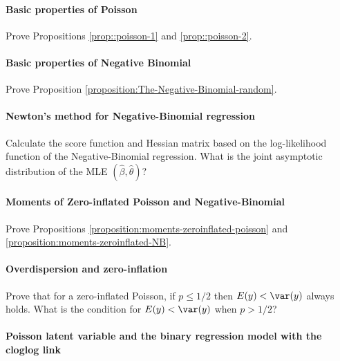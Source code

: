  
 
 \paragraph{Basic properties of Poisson}\label{hw19::poisson12}
 
Prove Propositions \ref{prop::poisson-1} and \ref{prop::poisson-2}.


 \paragraph{Basic properties of Negative Binomial}\label{hw19::nb-properties}

Prove Proposition \ref{proposition:The-Negative-Binomial-random}. 



\paragraph{Newton's method for Negative-Binomial regression}\label{hw19::derivatives-nb-reg}

Calculate the score function and Hessian matrix based on the log-likelihood function of the Negative-Binomial regression.
What is the joint asymptotic distribution of the MLE $(\hat\beta, \hat\theta)$?





\paragraph{Moments of Zero-inflated Poisson and Negative-Binomial}\label{hw19::moment-0-poisson}

Prove Propositions \ref{proposition:moments-zeroinflated-poisson} and \ref{proposition:moments-zeroinflated-NB}. 


\paragraph{Overdispersion and zero-inflation}

Prove that for a zero-inflated Poisson, if $p \leq 1/2$ then $E(y) < \var(y)$ always holds. What is the condition for $E(y) < \var(y)$ when $p>1/2$?




\paragraph{Poisson latent variable and the binary regression model with the cloglog link}\label{hw19::poisson-logistic}

